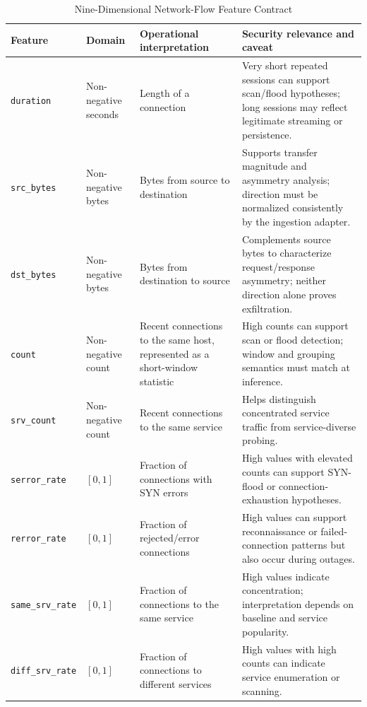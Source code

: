 \documentclass[conference]{IEEEtran}
\begin{document}
\begin{table}[t]
\centering
\caption{Nine-Dimensional Network-Flow Feature Contract}
\label{tab:flowfeatures}
\scriptsize
\begin{tabular}{p{1.6cm}p{1.8cm}p{4.0cm}p{5.6cm}}
\toprule
\textbf{Feature} & \textbf{Domain} & \textbf{Operational interpretation} & \textbf{Security relevance and caveat}\\
\midrule
\texttt{duration} & Non-negative seconds & Length of a connection & Very short repeated sessions can support scan/flood hypotheses; long sessions may reflect legitimate streaming or persistence.\\
\texttt{src\_bytes} & Non-negative bytes & Bytes from source to destination & Supports transfer magnitude and asymmetry analysis; direction must be normalized consistently by the ingestion adapter.\\
\texttt{dst\_bytes} & Non-negative bytes & Bytes from destination to source & Complements source bytes to characterize request/response asymmetry; neither direction alone proves exfiltration.\\
\texttt{count} & Non-negative count & Recent connections to the same host, represented as a short-window statistic & High counts can support scan or flood detection; window and grouping semantics must match at inference.\\
\texttt{srv\_count} & Non-negative count & Recent connections to the same service & Helps distinguish concentrated service traffic from service-diverse probing.\\
\texttt{serror\_rate} & $[0,1]$ & Fraction of connections with SYN errors & High values with elevated counts can support SYN-flood or connection-exhaustion hypotheses.\\
\texttt{rerror\_rate} & $[0,1]$ & Fraction of rejected/error connections & High values can support reconnaissance or failed-connection patterns but also occur during outages.\\
\texttt{same\_srv\_rate} & $[0,1]$ & Fraction of connections to the same service & High values indicate concentration; interpretation depends on baseline and service popularity.\\
\texttt{diff\_srv\_rate} & $[0,1]$ & Fraction of connections to different services & High values with high counts can indicate service enumeration or scanning.\\
\bottomrule
\end{tabular}
\end{table}
\end{document}
